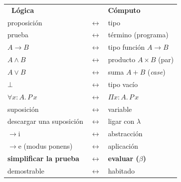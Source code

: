 \documentclass[12pt]{article}
\begin{document}
\newpage

\begin{minipage}[t]{0.47\textwidth}\vspace{0pt}
\renewcommand{\arraystretch}{1.16}
\begin{tabular}{@{}>{\raggedright}p{5.4cm} c >{\raggedright\arraybackslash}p{5.6cm}@{}}
\rowcolor{e9}\color{white}\textbf{\ Lógica} & & \color{white}\textbf{Cómputo}\\
proposición & $\leftrightarrow$ & tipo\\
prueba & $\leftrightarrow$ & término (programa)\\
\rowcolor{e9!10}$A\to B$ & $\leftrightarrow$ & tipo función $A\to B$\\
\rowcolor{e9!10}$A\wedge B$ & $\leftrightarrow$ & producto $A\times B$ (par)\\
\rowcolor{e9!10}$A\vee B$ & $\leftrightarrow$ & suma $A+B$ (\emph{case})\\
\rowcolor{e9!10}$\bot$ & $\leftrightarrow$ & tipo vacío\\
\rowcolor{e9!10}$\forall x{:}A.\,P\,x$ & $\leftrightarrow$ & $\Pi x{:}A.\,P\,x$\\
suposición & $\leftrightarrow$ & variable\\
descargar una suposición & $\leftrightarrow$ & ligar con $\lambda$\\
$\to$i & $\leftrightarrow$ & abstracción\\
$\to$e (modus ponens) & $\leftrightarrow$ & aplicación\\
\rowcolor{verde!12}\textbf{simplificar la prueba} & $\leftrightarrow$ & \textbf{evaluar ($\beta$)}\\
demostrable & $\leftrightarrow$ & habitado\\
\end{tabular}
\end{minipage}\hfill
\end{document}
